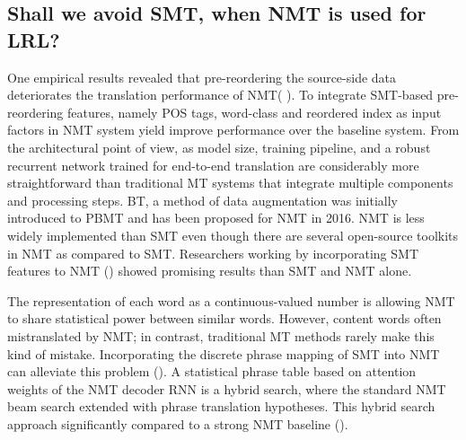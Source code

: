 \documentclass[manuscript,screen]{acmart}
\begin{document}
\subsection{Shall we avoid SMT, when NMT is used for LRL?}
One empirical results revealed that pre-reordering the source-side data deteriorates the translation performance of NMT( \citet{du2017pre}). To integrate SMT-based pre-reordering features, namely POS tags, word-class and reordered index as input factors in NMT system yield improve performance over the baseline system.
From the architectural point of view, as model size, training pipeline, and a robust recurrent network trained for end-to-end translation are considerably more straightforward than traditional MT systems that integrate multiple components and processing steps.
BT, a method of data augmentation was initially introduced to PBMT and has been proposed for NMT in 2016. NMT is less widely implemented than SMT even though there are several open-source toolkits in NMT as compared to SMT.
Researchers working by incorporating SMT features to NMT (\citet{he2016improved, stahlberg2016syntactically, wang2017neural}) showed promising results than SMT and NMT alone.

The representation of each word as a continuous-valued number is allowing NMT to share statistical power between similar words. However, content words often mistranslated by NMT; in contrast, traditional MT methods rarely make this kind of mistake. Incorporating the discrete phrase mapping of SMT into NMT can alleviate this problem (\citet{arthur2016incorporating}). A statistical phrase table based on attention weights of the NMT decoder RNN is a hybrid search, where the standard NMT beam search extended with phrase translation hypotheses. This hybrid search approach significantly compared to a strong NMT baseline (\citet{dahlmann2017neural}).
\end{document}
